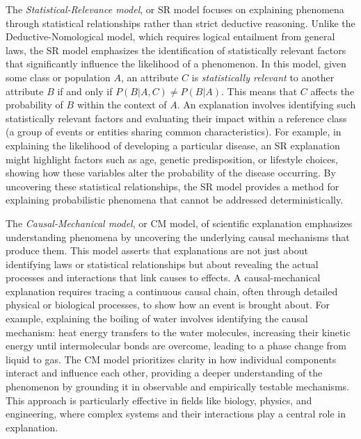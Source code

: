 The \emph{Statistical-Relevance model}, or SR model focuses on explaining phenomena through statistical relationships rather than strict deductive reasoning. Unlike the Deductive-Nomological model, which requires logical entailment from general laws, the SR model emphasizes the identification of statistically relevant factors that significantly influence the likelihood of a phenomenon. In this model, given some class or population \( A \), an attribute \( C \) is \emph{statistically relevant} to another attribute \( B \) if and only if \( P(B | A, C) \neq P(B | A) \). This means that \( C \) affects the probability of \( B \) within the context of \( A \). An explanation involves identifying such statistically relevant factors and evaluating their impact within a reference class (a group of events or entities sharing common characteristics). For example, in explaining the likelihood of developing a particular disease, an SR explanation might highlight factors such as age, genetic predisposition, or lifestyle choices, showing how these variables alter the probability of the disease occurring. By uncovering these statistical relationships, the SR model provides a method for explaining probabilistic phenomena that cannot be addressed deterministically.

The \emph{Causal-Mechanical model}, or CM model, of scientific explanation emphasizes understanding phenomena by uncovering the underlying causal mechanisms that produce them. This model asserts that explanations are not just about identifying laws or statistical relationships but about revealing the actual processes and interactions that link causes to effects. A causal-mechanical explanation requires tracing a continuous causal chain, often through detailed physical or biological processes, to show how an event is brought about. For example, explaining the boiling of water involves identifying the causal mechanism: heat energy transfers to the water molecules, increasing their kinetic energy until intermolecular bonds are overcome, leading to a phase change from liquid to gas. The CM model prioritizes clarity in how individual components interact and influence each other, providing a deeper understanding of the phenomenon by grounding it in observable and empirically testable mechanisms. This approach is particularly effective in fields like biology, physics, and engineering, where complex systems and their interactions play a central role in explanation.

